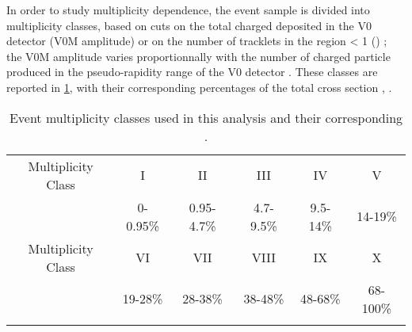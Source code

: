 In order to study multiplicity dependence, the event sample is divided into multiplicity classes, based on cuts on the total charged deposited in the V0 detector (V0M amplitude) or on the number of tracklets in the region \abspseudorap < 1 (\Ntracklet) ; the V0M amplitude varies proportionnally with the number of charged particle produced in the pseudo-rapidity range of the V0 detector \cite{alice_collaboration_performance_2013}. These classes are reported in \tab \ref{MultClass}, with their corresponding percentages of the total cross section \INELZero, \sigmaINELZero.

\begin{table}[h]
    \centering
    \begin{tabular}{c|ccccc}
    \noalign{\smallskip}\hline \hline \noalign{\smallskip}
    Multiplicity Class & I & II & III & IV & V \\
	\sigmaINELZero & 0-0.95\% & 0.95-4.7\% & 4.7-9.5\% & 9.5-14\% & 14-19\% \\	        	\noalign{\smallskip}\hline \hline \noalign{\smallskip}
	Multiplicity Class & VI & VII & VIII & IX & X \\
	\sigmaINELZero & 19-28\% & 28-38\% & 38-48\% & 48-68\% & 68-100\% \\
    \noalign{\smallskip}\hline \hline \noalign{\smallskip}
    \end{tabular}
    \caption{Event multiplicity classes used in this analysis and their corresponding \sigmaINELZero \cite{alice_collaboration_production_2020}.}\label{MultClass}
\end{table}
